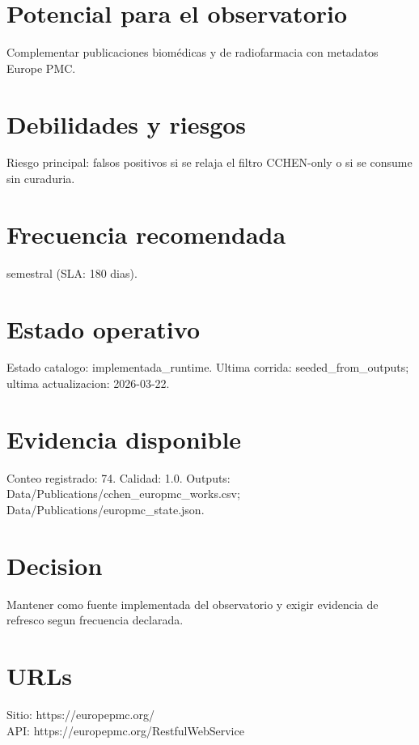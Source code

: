 \documentclass[10pt,a4paper]{article}
\begin{document}
\section*{Potencial para el observatorio}
Complementar publicaciones biomédicas y de radiofarmacia con metadatos Europe PMC.

\section*{Debilidades y riesgos}
Riesgo principal: falsos positivos si se relaja el filtro CCHEN-only o si se consume sin curaduria.

\section*{Frecuencia recomendada}
semestral (SLA: 180 dias).

\section*{Estado operativo}
Estado catalogo: implementada\_runtime. Ultima corrida: seeded\_from\_outputs; ultima actualizacion: 2026-03-22.

\section*{Evidencia disponible}
Conteo registrado: 74. Calidad: 1.0. Outputs: Data/Publications/cchen\_europmc\_works.csv; Data/Publications/europmc\_state.json.

\section*{Decision}
Mantener como fuente implementada del observatorio y exigir evidencia de refresco segun frecuencia declarada.


\section*{URLs}
Sitio: https://europepmc.org/\\
API: https://europepmc.org/RestfulWebService
\end{document}
